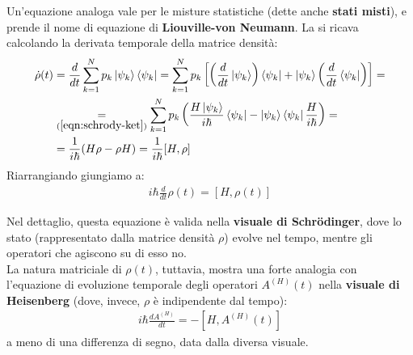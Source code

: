 \documentclass[../../InformazioneQuantistica.tex]{subfiles}
\begin{document}
Un'equazione analoga vale per le misture statistiche (dette anche \textbf{stati misti}), e prende il nome di equazione di \textbf{Liouville-von Neumann}. La si ricava calcolando la derivata temporale della matrice densità:
\begin{align*}
\dot{\rho}(t) &=\frac{d}{dt} \sum_{k=1}^N p_k \Ket{\psi_k}\Bra{\psi_k} = \sum_{k=1}^N p_k \left[\left(\frac{d}{dt}\Ket{\psi_k}\right) \Bra{\psi_k} + \Ket{\psi_k}\left(\frac{d}{dt}\Bra{\psi_k}\right)\right]=\\
&\underset{(\ref{eqn:schrody-ket})}{=} 
\sum_{k=1}^N p_k \left( \frac{H \Ket{\psi_k}}{i\hbar}\Bra{\psi_k} - \Ket{\psi_k} \Bra{\psi_k} \frac{H}{i\hbar}\right) =
\\
&=\frac{1}{i\hbar}(H\rho - \rho H) = \frac{1}{i\hbar}[H,\rho]
\end{align*}
Riarrangiando giungiamo a:
\begin{align*}
i\hbar \frac{d}{dt}\rho(t) =[H,\rho(t)]
\end{align*}
\begin{expl}
Nel dettaglio, questa equazione è valida nella \textbf{visuale di Schr\"odinger}, dove lo stato (rappresentato dalla matrice densità $\rho$) evolve nel tempo, mentre gli operatori che agiscono su di esso no.\\
La natura matriciale di $\rho(t)$, tuttavia, mostra una forte analogia con l'equazione di evoluzione temporale degli operatori $A^{(H)}(t)$ nella \textbf{visuale di Heisenberg} (dove, invece, $\rho$ è indipendente dal tempo):
\begin{align*}
i\hbar\frac{d A^{(H)}}{dt} = -[H,A^{(H)}(t)]
\end{align*}
a meno di una differenza di segno, data dalla diversa visuale.
\end{expl}
\end{document}
